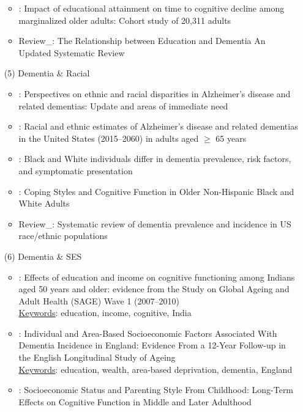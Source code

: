 \documentclass[12pt]{article}
\begin{document}
\begin{itemize}
\begin{itemize}
        \item \cite{jester2023impact}: Impact of educational attainment on time to cognitive decline among marginalized older adults: Cohort study of 20,311 adults
        \item Review\_\cite{sharp2011relationship}: The Relationship between Education and Dementia An Updated Systematic Review
    \end{itemize}
    \item[(5)] Dementia \& Racial
    \begin{itemize}
        \item \cite{babulal2019perspectives}: Perspectives on ethnic and racial disparities in Alzheimer’s disease and related dementias: Update and areas of immediate need
        \item \cite{matthews2019racial}: Racial and ethnic estimates of Alzheimer’s disease and related dementias in the United States (2015–2060) in adults aged $\geq$ 65 years
        \item \cite{lennon2022black}: Black and White individuals differ in dementia prevalence, risk factors, and symptomatic presentation
        \item \cite{lee2023coping}: Coping Styles and Cognitive Function in Older Non-Hispanic Black and White Adults
        \item Review\_\cite{mehta2017systematic}: Systematic review of dementia prevalence and incidence in US race/ethnic populations
    \end{itemize}
    \item[(6)] Dementia \& SES
    \begin{itemize}
        \item \cite{basu2013effects}: Effects of education and income on cognitive functioning among Indians aged 50 years and older: evidence from the Study on Global Ageing and Adult Health (SAGE) Wave 1 (2007–2010) \\
        \uline{Keywords}: education, income, cognitive, India
        \item \cite{cadar2018individual}: Individual and Area-Based Socioeconomic Factors Associated With Dementia Incidence in England: Evidence From a 12-Year Follow-up in the English Longitudinal Study of Ageing \\
        \uline{Keywords}: education, wealth, area-based deprivation, dementia, England
        \item \cite{liu2019socioeconomic}: Socioeconomic Status and Parenting Style From Childhood: Long-Term Effects on Cognitive Function in Middle and Later Adulthood \\

\end{itemize}
\end{itemize}
\end{document}
